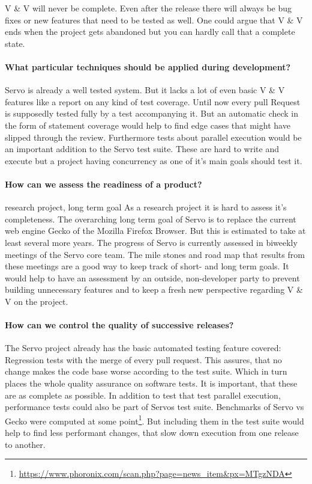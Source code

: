 \documentclass{scrartcl}
\begin{document}
V \& V will never be complete. Even after the release there will always be bug fixes or new features that need to be tested as well. One could argue that V \& V ends when the project gets abandoned but you can hardly call that a complete state.

\paragraph{What particular techniques should be applied during development?}
Servo is already a well tested system. But it lacks a lot of even basic V \& V features like a report on any kind of test coverage. Until now every pull Request is supposedly tested fully by a test accompanying it. But an automatic check in the form of statement coverage would help to find edge cases that might have slipped through the review. Furthermore tests about parallel execution would be an important addition to the Servo test suite. These are hard to write and execute but a project having concurrency as one of it's main goals should test it.

\paragraph{How can we assess the readiness of a product?} research project, long term goal
As a research project it is hard to assess it's completeness. The overarching long term goal of Servo is to replace the current web engine Gecko of the Mozilla Firefox Browser. But this is estimated to take at least several more years. The progress of Servo is currently assessed in biweekly meetings of the Servo core team. The mile stones and road map that results from these meetings are a good way to keep track of short- and long term goals. It would help to have an assessment by an outside, non-developer party to prevent building unnecessary features and to keep a fresh new perspective regarding V \& V on the project.

\paragraph{How can we control the quality of successive releases?}
The Servo project already has the basic automated testing feature covered: Regression tests with the merge of every pull request. This assures, that no change makes the code base worse according to the test suite. Which in turn places the whole quality assurance on software tests. It is important, that these are as complete as possible. In addition to test that test parallel execution, performance tests could also be part of Servos test suite. Benchmarks of Servo vs Gecko were computed at some point\footnote{\url{https://www.phoronix.com/scan.php?page=news_item&px=MTgzNDA}}. But including them in the test suite would help to find less performant changes, that slow down execution from one release to another.
\end{document}
